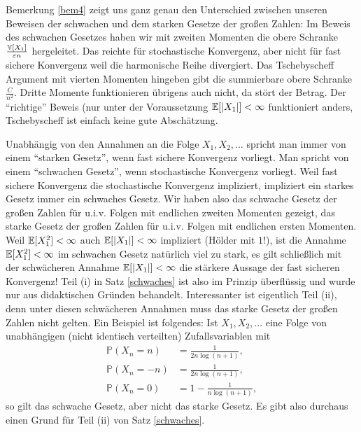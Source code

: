 Bemerkung \ref{bem4} zeigt uns ganz genau den Unterschied zwischen unseren Beweisen der schwachen und dem starken Gesetze der gro\ss en Zahlen: Im Beweis des schwachen Gesetzes haben wir mit zweiten Momenten die obere Schranke $\frac{\mathbb{V}[X_1]}{\varepsilon n}$ hergeleitet. Das reichte f\"ur stochastische Konvergenz, aber nicht f\"ur fast sichere Konvergenz weil die harmonische Reihe divergiert. Das Tschebyscheff Argument mit vierten Momenten hingeben gibt die summierbare obere Schranke $\frac{C}{n^2}$.  Dritte Momente funktionieren \"ubrigens auch nicht, da st\"ort der Betrag. Der \enquote{richtige} Beweis (nur unter der Voraussetzung $\mathbb{E}[|X_1|]<\infty$ funktioniert anders, Tschebyscheff ist einfach keine gute Absch\"atzung.
\begin{bem}
Unabh\"angig von den Annahmen an die Folge $X_1, X_2, ...$ spricht man immer von einem \enquote{starken Gesetz}, wenn fast sichere Konvergenz vorliegt. Man spricht von einem \enquote{schwachen Gesetz}, wenn stochastische Konvergenz vorliegt. Weil fast sichere Konvergenz die stochastische Konvergenz impliziert, impliziert ein starkes Gesetz immer ein schwaches Gesetz. Wir haben also das schwache Gesetz der gro\ss en Zahlen f\"ur u.i.v. Folgen mit endlichen zweiten Momenten gezeigt, das starke Gesetz der gro\ss en Zahlen f\"ur u.i.v. Folgen mit endlichen ersten Momenten. Weil $\mathbb{E}[X_1^2]<\infty$ auch $\mathbb{E}[|X_1|]<\infty$ impliziert (Hölder mit $1$!), ist die Annahme $\mathbb{E}[X_1^2]<\infty$ im schwachen Gesetz nat\"urlich viel zu stark, es gilt schlie\ss lich mit der schw\"acheren Annahme $\mathbb{E}[|X_1|]<\infty$ die st\"arkere Aussage der fast sicheren Konvergenz! Teil (i) in Satz \ref{schwaches} ist also im Prinzip \"uberfl\"ussig und wurde nur aus didaktischen Gr\"unden behandelt. Interessanter ist eigentlich Teil (ii), denn unter diesen schw\"acheren Annahmen muss das starke Gesetz der gro\ss en Zahlen nicht gelten. Ein Beispiel ist folgendes: Ist $X_1, X_2, ...$ eine Folge von unabh\"angigen (nicht identisch verteilten) Zufallsvariablen mit 
\begin{align*}
	\mathbb P(X_n=n)&=\frac{1}{2 n \log(n+1)},\\
	\mathbb P(X_n=-n)&=\frac{1}{2 n \log(n+1)},\\
	\mathbb P(X_n=0)&=1-\frac{1}{ n \log(n+1)},
\end{align*}
so gilt das schwache Gesetz, aber nicht das starke Gesetz. Es gibt also durchaus einen Grund f\"ur Teil (ii) von Satz \ref{schwaches}.
\end{bem}

